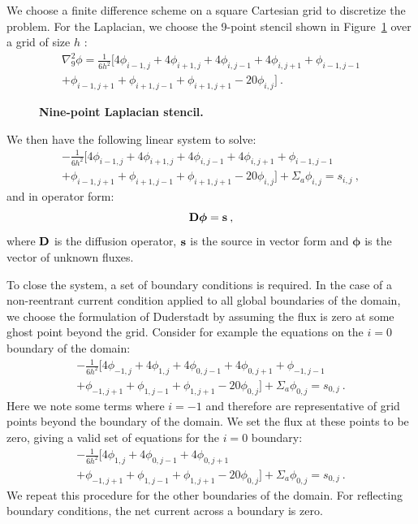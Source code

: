 We choose a finite difference scheme on a square Cartesian grid to
discretize the problem. For the Laplacian, we choose the 9-point
stencil shown in Figure~\ref{fig:stencil} over a grid of size $h$
\citep{leveque_finite_2007}:
\begin{multline}
  \nabla^2_9\phi = \frac{1}{6h^2}[4 \phi_{i-1,j} + 4 \phi_{i+1,j}
    + 4 \phi_{i,j-1} + 4 \phi_{i,j+1} + \phi_{i-1,j-1}\\ +
    \phi_{i-1,j+1} + \phi_{i+1,j-1} + \phi_{i+1,j+1} - 20
    \phi_{i,j}]\:.
  \label{eq:nine_point_stencil}
\end{multline}
\begin{figure}[t!]
  \begin{center}
    \scalebox{1.25}{}
  \end{center}
  \caption{\textbf{Nine-point Laplacian stencil.}}
  \label{fig:stencil}
\end{figure}
We then have the following linear system to solve:
\begin{multline}
  -\frac{1}{6h^2}[4 \phi_{i-1,j} + 4 \phi_{i+1,j} + 4
    \phi_{i,j-1} + 4 \phi_{i,j+1} + \phi_{i-1,j-1}\\ + \phi_{i-1,j+1}
    + \phi_{i+1,j-1} + \phi_{i+1,j+1} - 20 \phi_{i,j}] + \Sigma_a
  \phi_{i,j} = s_{i,j}\:,
  \label{eq:fd_system}
\end{multline}
and in operator form:
\begin{equation}
  \mathbf{D}\boldsymbol{\phi}=\mathbf{s}\:,
  \label{eq:operator_system}
\end{equation}
where $\mathbf{D}$ is the diffusion operator, $\mathbf{s}$ is the source in
vector form and $\boldsymbol{\phi}$ is the vector of unknown fluxes.

To close the system, a set of boundary conditions is required. In the
case of a non-reentrant current condition applied to all global
boundaries of the domain, we choose the formulation of Duderstadt by
assuming the flux is zero at some ghost point beyond the
grid. Consider for example the equations on the $i=0$ boundary of the
domain:
\begin{multline}
  -\frac{1}{6h^2}[4 \phi_{-1,j} + 4 \phi_{1,j} + 4 \phi_{0,j-1} +
    4 \phi_{0,j+1} + \phi_{-1,j-1}\\ + \phi_{-1,j+1} + \phi_{1,j-1} +
    \phi_{1,j+1} - 20 \phi_{0,j}] + \Sigma_a \phi_{0,j} = s_{0,j}\:.
  \label{eq:x_min_bnd}
\end{multline}
Here we note some terms where $i=-1$ and therefore are representative
of grid points beyond the boundary of the domain. We set the flux at
these points to be zero, giving a valid set of equations for the $i=0$
boundary:
\begin{multline}
  -\frac{1}{6h^2}[4 \phi_{1,j} + 4 \phi_{0,j-1} + 4 \phi_{0,j+1}
    \\ + \phi_{-1,j+1} + \phi_{1,j-1} + \phi_{1,j+1} - 20 \phi_{0,j}]
  + \Sigma_a \phi_{0,j} = s_{0,j}\:.
  \label{eq:x_min_bnd_2}
\end{multline}
We repeat this procedure for the other boundaries of the domain. For
reflecting boundary conditions, the net current across a boundary is
zero.

